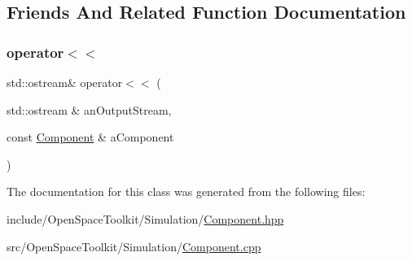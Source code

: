 \subsection{Friends And Related Function Documentation}
\mbox{\label{classostk_1_1simulation_1_1_component_ae3c657f10ed74f15e3356a2ff54647f3}} 
\subsubsection{\texorpdfstring{operator$<$$<$}{operator<<}}
{\footnotesize\ttfamily std\+::ostream\& operator$<$$<$ (\begin{DoxyParamCaption}\item[{std\+::ostream \&}]{an\+Output\+Stream,  }\item[{const \hyperlink{classostk_1_1simulation_1_1_component}{Component} \&}]{a\+Component }\end{DoxyParamCaption})\hspace{0.3cm}{\ttfamily [friend]}}



The documentation for this class was generated from the following files\+:\begin{DoxyCompactItemize}
\item 
include/\+Open\+Space\+Toolkit/\+Simulation/\hyperlink{_component_8hpp}{Component.\+hpp}\item 
src/\+Open\+Space\+Toolkit/\+Simulation/\hyperlink{_component_8cpp}{Component.\+cpp}\end{DoxyCompactItemize}
